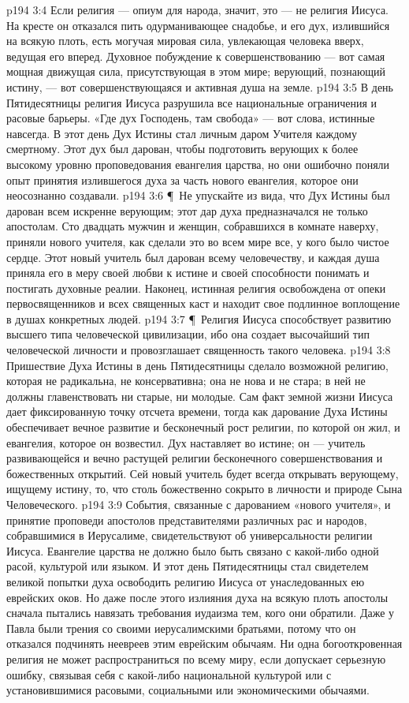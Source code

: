\vs p194 3:4 Если религия --- опиум для народа, значит, это --- не религия Иисуса. На кресте он отказался пить одурманивающее снадобье, и его дух, излившийся на всякую плоть, есть могучая мировая сила, увлекающая человека вверх, ведущая его вперед. Духовное побуждение к совершенствованию --- вот самая мощная движущая сила, присутствующая в этом мире; верующий, познающий истину, --- вот совершенствующаяся и активная душа на земле.
\vs p194 3:5 В день Пятидесятницы религия Иисуса разрушила все национальные ограничения и расовые барьеры. «Где дух Господень, там свобода» --- вот слова, истинные навсегда. В этот день Дух Истины стал личным даром Учителя каждому смертному. Этот дух был дарован, чтобы подготовить верующих к более высокому уровню проповедования евангелия царства, но они ошибочно поняли опыт принятия излившегося духа за часть нового евангелия, которое они неосознанно создавали.
\vs p194 3:6 \P\ Не упускайте из вида, что Дух Истины был дарован всем искренне верующим; этот дар духа предназначался не только апостолам. Сто двадцать мужчин и женщин, собравшихся в комнате наверху, приняли нового учителя, как сделали это во всем мире все, у кого было чистое сердце. Этот новый учитель был дарован всему человечеству, и каждая душа приняла его в меру своей любви к истине и своей способности понимать и постигать духовные реалии. Наконец, истинная религия освобождена от опеки первосвященников и всех священных каст и находит свое подлинное воплощение в душах конкретных людей.
\vs p194 3:7 \P\ Религия Иисуса способствует развитию высшего типа человеческой цивилизации, ибо она создает высочайший тип человеческой личности и провозглашает священность такого человека.
\vs p194 3:8 Пришествие Духа Истины в день Пятидесятницы сделало возможной религию, которая не радикальна, не консервативна; она не нова и не стара; в ней не должны главенствовать ни старые, ни молодые. Сам факт земной жизни Иисуса дает фиксированную точку отсчета времени, тогда как дарование Духа Истины обеспечивает вечное развитие и бесконечный рост религии, по которой он жил, и евангелия, которое он возвестил. Дух наставляет во  истине; он --- учитель развивающейся и вечно растущей религии бесконечного совершенствования и божественных открытий. Сей новый учитель будет всегда открывать верующему, ищущему истину, то, что столь божественно сокрыто в личности и природе Сына Человеческого.
\vs p194 3:9 События, связанные с дарованием «нового учителя», и принятие проповеди апостолов представителями различных рас и народов, собравшимися в Иерусалиме, свидетельствуют об универсальности религии Иисуса. Евангелие царства не должно было быть связано с какой\hyp{}либо одной расой, культурой или языком. И этот день Пятидесятницы стал свидетелем великой попытки духа освободить религию Иисуса от унаследованных ею еврейских оков. Но даже после этого излияния духа на всякую плоть апостолы сначала пытались навязать требования иудаизма тем, кого они обратили. Даже у Павла были трения со своими иерусалимскими братьями, потому что он отказался подчинять неевреев этим еврейским обычаям. Ни одна богооткровенная религия не может распространиться по всему миру, если допускает серьезную ошибку, связывая себя с какой\hyp{}либо национальной культурой или с установившимися расовыми, социальными или экономическими обычаями.
